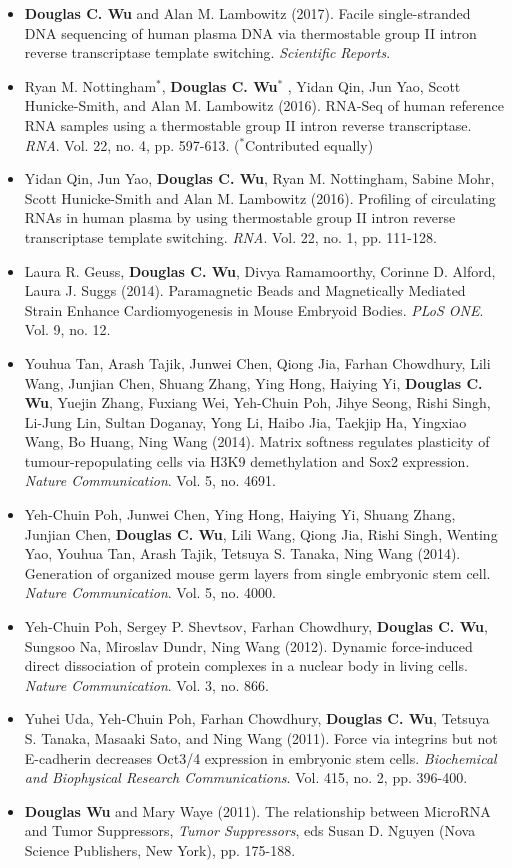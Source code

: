 \documentclass[dvips,11pt]{article}
\begin{document}
\begin{itemize}
	\setlength{\itemsep}{2pt}
	\item {\bf Douglas C. Wu} and Alan M. Lambowitz (2017). Facile single-stranded DNA sequencing of human plasma DNA via thermostable group II intron reverse transcriptase template switching. {\it Scientific Reports}.
	\item Ryan M. Nottingham$^*$, {\bf Douglas C. Wu$^*$} , Yidan Qin, Jun Yao, Scott Hunicke-Smith, and Alan M. Lambowitz (2016). RNA-Seq of human reference RNA samples using a thermostable group II intron reverse transcriptase. {\it RNA}. Vol. 22, no. 4, pp. 597-613. ($^*$Contributed equally)
	\item Yidan Qin, Jun Yao, {\bf Douglas C. Wu}, Ryan M. Nottingham, Sabine Mohr, Scott Hunicke-Smith and Alan M. Lambowitz (2016). Profiling of circulating RNAs in human plasma by using thermostable group II intron reverse transcriptase template switching. {\it RNA}. Vol. 22, no. 1, pp. 111-128.
	\item Laura R. Geuss, {\bf Douglas C. Wu}, Divya Ramamoorthy, Corinne D. Alford, Laura J. Suggs (2014). Paramagnetic Beads and Magnetically Mediated Strain Enhance Cardiomyogenesis in Mouse Embryoid Bodies. {\it PLoS ONE}. Vol. 9, no. 12.
	\item Youhua Tan, Arash Tajik, Junwei Chen, Qiong Jia, Farhan Chowdhury, Lili Wang, Junjian Chen, Shuang Zhang, Ying Hong, Haiying Yi, {\bf Douglas C. Wu}, Yuejin Zhang, Fuxiang Wei, Yeh-Chuin Poh, Jihye Seong, Rishi Singh, Li-Jung Lin, Sultan Doganay, Yong Li, Haibo Jia, Taekjip Ha, Yingxiao Wang, Bo Huang, Ning Wang (2014). Matrix softness regulates plasticity of tumour-repopulating cells via H3K9 demethylation and Sox2 expression. {\it Nature Communication}. Vol. 5, no. 4691.
	\item Yeh-Chuin Poh, Junwei Chen, Ying Hong, Haiying Yi, Shuang Zhang, Junjian Chen, {\bf Douglas C. Wu}, Lili Wang, Qiong Jia, Rishi Singh, Wenting Yao, Youhua Tan, Arash Tajik, Tetsuya S. Tanaka, Ning Wang (2014). Generation of organized mouse germ layers from single embryonic stem cell. {\it Nature Communication}. Vol. 5, no. 4000.
	\item Yeh-Chuin Poh, Sergey P. Shevtsov, Farhan Chowdhury, { \bf Douglas C. Wu}, Sungsoo Na, Miroslav Dundr, Ning Wang (2012). Dynamic force-induced direct dissociation of protein complexes in a nuclear body in living cells. {\it Nature Communication}. Vol. 3, no. 866.
	\item Yuhei Uda, Yeh-Chuin Poh, Farhan Chowdhury, { \bf Douglas C. Wu}, Tetsuya S. Tanaka, Masaaki Sato, and Ning Wang (2011). Force via integrins but not E-cadherin decreases Oct3/4 expression in embryonic stem cells. {\it Biochemical and Biophysical Research Communications}. Vol. 415, no. 2, pp. 396-400.
	\item {\bf Douglas Wu} and Mary Waye (2011). The relationship between MicroRNA and Tumor Suppressors, {\it Tumor Suppressors}, eds Susan D. Nguyen (Nova Science Publishers, New York), pp. 175-188.
\end{itemize}
\end{document}
